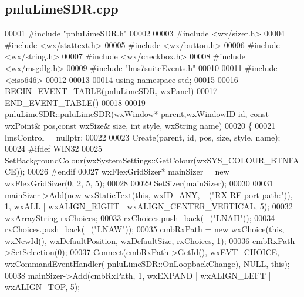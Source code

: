 \subsection{pnlu\+Lime\+S\+D\+R.\+cpp}
\label{pnluLimeSDR_8cpp_source}

\begin{DoxyCode}
00001 \textcolor{preprocessor}{#include "pnluLimeSDR.h"}
00002 
00003 \textcolor{preprocessor}{#include <wx/sizer.h>}
00004 \textcolor{preprocessor}{#include <wx/stattext.h>}
00005 \textcolor{preprocessor}{#include <wx/button.h>}
00006 \textcolor{preprocessor}{#include <wx/string.h>}
00007 \textcolor{preprocessor}{#include <wx/checkbox.h>}
00008 \textcolor{preprocessor}{#include <wx/msgdlg.h>}
00009 \textcolor{preprocessor}{#include "lms7suiteEvents.h"}
00010 
00011 \textcolor{preprocessor}{#include <ciso646>}
00012 
00013 
00014 \textcolor{keyword}{using namespace }std;
00015 
00016 BEGIN\_EVENT\_TABLE(pnluLimeSDR, wxPanel)
00017 END\_EVENT\_TABLE()
00018 
00019 pnluLimeSDR::pnluLimeSDR(wxWindow* parent,wxWindowID \textcolor{keywordtype}{id}, const wxPoint& pos,const wxSize& 
      size, \textcolor{keywordtype}{int} style, wxString name)
00020 \{
00021     lmsControl = \textcolor{keyword}{nullptr};
00022 
00023     Create(parent, \textcolor{keywordtype}{id}, pos, size, style, name);
00024 \textcolor{preprocessor}{#ifdef WIN32}
00025     SetBackgroundColour(wxSystemSettings::GetColour(wxSYS\_COLOUR\_BTNFACE));
00026 \textcolor{preprocessor}{#endif}
00027     wxFlexGridSizer* mainSizer = \textcolor{keyword}{new} wxFlexGridSizer(0, 2, 5, 5);
00028 
00029     SetSizer(mainSizer);
00030     
00031     mainSizer->Add(\textcolor{keyword}{new} wxStaticText(\textcolor{keyword}{this}, wxID\_ANY, \_(\textcolor{stringliteral}{"RX RF port path:"})), 1, wxALL | wxALIGN\_RIGHT | 
      wxALIGN\_CENTER\_VERTICAL, 5);
00032     wxArrayString rxChoices;
00033     rxChoices.push\_back(\_(\textcolor{stringliteral}{"LNAH"}));
00034     rxChoices.push\_back(\_(\textcolor{stringliteral}{"LNAW"}));
00035     cmbRxPath = \textcolor{keyword}{new} wxChoice(\textcolor{keyword}{this}, wxNewId(), wxDefaultPosition, wxDefaultSize, rxChoices, 1);
00036     cmbRxPath->SetSelection(0);
00037     Connect(cmbRxPath->GetId(), wxEVT\_CHOICE, wxCommandEventHandler(
      pnluLimeSDR::OnLoopbackChange), NULL, \textcolor{keyword}{this});
00038     mainSizer->Add(cmbRxPath, 1, wxEXPAND | wxALIGN\_LEFT | wxALIGN\_TOP, 5);

\end{DoxyCode}
